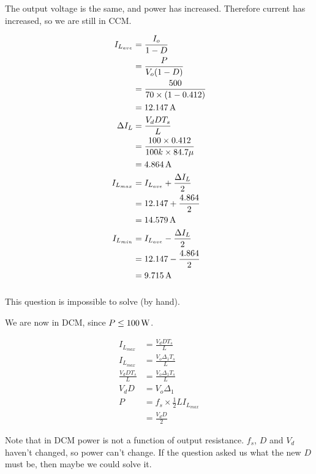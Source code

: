 The output voltage is the same, and power has increased. Therefore current has increased, so we are still in CCM.

\begin{align*}
I_{L_{ave}} & = \frac{I_o}{1-D} \\
            & = \frac{P}{V_o(1-D)} \\
            & = \frac{500}{70\times (1-0.412)} \\
            & = \unit[12.147]{A} \\
\Delta I_L  & = \frac{V_d DT_s}{L} \\
            & = \frac{100 \times 0.412}{100k \times 84.7\mu} \\
            & = \unit[4.864]{A} \\
I_{L_{max}} & = I_{L_{ave}} + \frac{\Delta I_L}{2} \\
            & = 12.147 + \frac{4.864}{2} \\
            & = \unit[14.579]{A} \\
I_{L_{min}} & = I_{L_{ave}} - \frac{\Delta I_L}{2} \\
            & = 12.147 - \frac{4.864}{2} \\
            & = \unit[9.715]{A} \\
\end{align*}

\subsubsection{}

This question is impossible to solve (by hand).

We are now in DCM, since $P\leq \unit[100]{W}$.

\begin{center}

\end{center}

\begin{align*}
I_{L_{max}} & = \frac{V_d DT_s}{L} \\
I_{L_{max}} & = \frac{V_o \Delta_1 T_s}{L} \\
\frac{V_d DT_s}{L} & = \frac{V_o \Delta_1 T_s}{L} \\
V_d D & = V_o \Delta_1\\
P     & = f_s \times \frac{1}{2} L I_{L_{max}}  \\
      & = \frac{V_d D}{2}
\end{align*}

Note that in DCM power is not a function of output resistance. $f_s$, $D$ and $V_d$ haven't changed, so power can't change.
If the question asked us what the new $D$ must be, then maybe we could solve it.